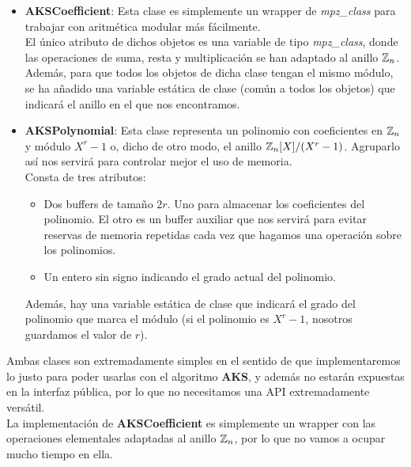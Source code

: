 \begin{itemize}
	\item \textbf{AKSCoefficient}: Esta clase es simplemente un wrapper de \textit{mpz\_class} para trabajar con aritmética modular más fácilmente.\\
	
	El único atributo de dichos objetos es una variable de tipo \textit{mpz\_class}, donde las operaciones de suma, resta y multiplicación se han adaptado al anillo $\mathbb{Z}_n$.\\
	
	Además, para que todos los objetos de dicha clase tengan el mismo módulo, se ha añadido una variable estática de clase (común a todos los objetos) que indicará el anillo en el que nos encontramos.
	
	\item \textbf{AKSPolynomial}: Esta clase representa un polinomio con coeficientes en $\mathbb{Z}_n$ y módulo $X^r - 1$ o, dicho de otro modo, el anillo $\mathbb{Z}_n[X]/(X^r - 1)$. Agruparlo así nos servirá para controlar mejor el uso de memoria.\\
	
	Consta de tres atributos:
	
	\begin{itemize}
		\item Dos buffers de tamaño $2r$. Uno para almacenar los coeficientes del polinomio. El otro es un buffer auxiliar que nos servirá para evitar reservas de memoria repetidas cada vez que hagamos una operación sobre los polinomios.
		
		\item Un entero sin signo indicando el grado actual del polinomio.
	\end{itemize}
	
	Además, hay una variable estática de clase que indicará el grado del polinomio que marca el módulo (si el polinomio es $X^r - 1$, nosotros guardamos el valor de $r$).
\end{itemize}

Ambas clases son extremadamente simples en el sentido de que implementaremos lo justo para poder usarlas con el algoritmo \textbf{AKS}, y además no estarán expuestas en la interfaz pública, por lo que no necesitamos una API extremadamente versátil.\\

La implementación de \textbf{AKSCoefficient} es simplemente un wrapper con las operaciones elementales adaptadas al anillo $\mathbb{Z}_n$, por lo que no vamos a ocupar mucho tiempo en ella.\\

